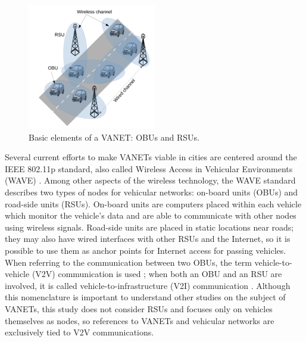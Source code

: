 
\begin{figure}[h]
    \centering
    \includegraphics[width=0.5\textwidth]{images/vanet.png}
    \caption{Basic elements of a VANET: OBUs and RSUs. \citep{saini2015close}}
    \label{fig:vanet}
\end{figure}

Several current efforts to make VANETs viable in cities are centered around the IEEE 802.11p standard, also called Wireless Access in Vehicular Environments (WAVE) \citep{jiang2008ieee}.
Among other aspects of the wireless technology, the WAVE standard describes two types of nodes for vehicular networks: on-board units (OBUs) and road-side units (RSUs).
On-board units are computers placed within each vehicle which monitor the vehicle's data and are able to communicate with other nodes using wireless signals.
Road-side units are placed in static locations near roads; they may also have wired interfaces with other RSUs and the Internet, so it is possible to use them as anchor points for Internet access for passing vehicles.
When referring to the communication between two OBUs, the term vehicle-to-vehicle (V2V) communication is used \citep{yang2004vehicle}; when both an OBU and an RSU are involved, it is called vehicle-to-infrastructure (V2I) communication \citep{chou2009feasibility}.
Although this nomenclature is important to understand other studies on the subject of VANETs, this study does not consider RSUs and focuses only on vehicles themselves as nodes, so references to VANETs and vehicular networks are exclusively tied to V2V communications.

